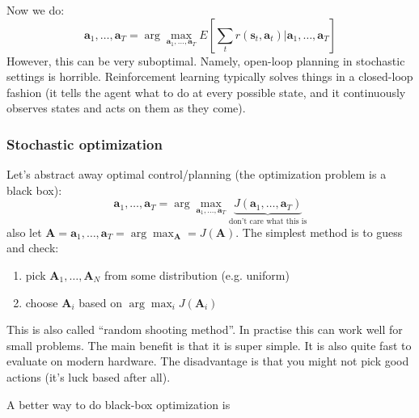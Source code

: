 \documentclass{report}
\newcommand{\argmax}{\arg\!\max}
\begin{document}
Now we do:
\begin{equation}
		\bm{a}_1, \dots, \bm{a}_T = \argmax_{\bm{a}_1, \dots, \bm{a}_T} E \left[ 
		\sum_{t}^{} r (\bm{s}_{t}, \bm{a}_{t} ) | \bm{a}_1, \dots, \bm{a}_T \right] 
\end{equation}
However, this can be very suboptimal. Namely, open-loop planning in stochastic settings is horrible.
Reinforcement learning typically solves things in a closed-loop fashion (it tells the agent what to do at every possible state,
and it continuously observes  states and acts on them as they come).

\subsubsection{Stochastic optimization}
Let's abstract away optimal control/planning (the optimization problem is a black box):
\begin{equation}
		\bm{a}_1, \dots, \bm{a}_T = \argmax_{\bm{a}_1, \dots, \bm{a}_T} \underbrace{J(\bm{a}_1, \dots, \bm{a}_T)}_{\text{don't care what this is}}
\end{equation}
also let $ \bm{A} = \bm{a}_1, \dots, \bm{a}_T =  \argmax_{\bm{A}} = J(\bm{A}) $.
The simplest method is to guess and check:
\begin{enumerate}
		\item pick $\bm{A}_1, \dots, \bm{A}_N $ from some distribution (e.g. uniform)
		\item choose $\bm{A}_i$ based on $\argmax_i J(\bm{A}_i)  $
\end{enumerate}
This is also called ``random shooting method''.
In practise this can work well for small problems.
The main benefit is that it is super simple. It is also quite fast to evaluate on modern hardware.
The disadvantage is that you might not pick good actions (it's luck based after all).

A better way to do black-box optimization is
\end{document}
